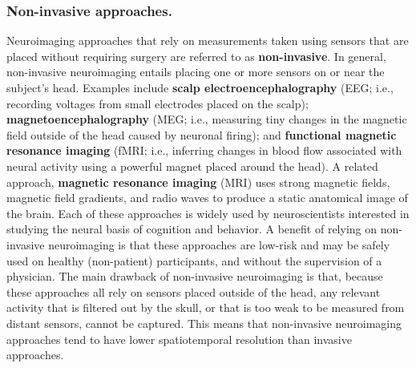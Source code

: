 \documentclass{llmxive}
\begin{document}
\subsubsection{Non-invasive approaches.}
Neuroimaging approaches that rely on measurements taken using sensors
that are placed without requiring surgery are referred to as
\textbf{non-invasive}.  In general, non-invasive neuroimaging entails
placing one or more sensors on or near the subject's head.  Examples
include \textbf{scalp electroencephalography} (EEG; i.e., recording
voltages from small electrodes placed on the scalp);
\textbf{magnetoencephalography} (MEG; i.e., measuring tiny changes in
the magnetic field outside of the head caused by neuronal firing); and
\textbf{functional magnetic resonance imaging} (fMRI; i.e., inferring
changes in blood flow associated with neural activity using a powerful
magnet placed around the head).  A related approach, \textbf{magnetic
  resonance imaging} (MRI) uses strong magnetic fields, magnetic field
gradients, and radio waves to produce a static anatomical image of the
brain.  Each of these approaches is widely used by neuroscientists
interested in studying the neural basis of cognition and behavior.  A
benefit of relying on non-invasive neuroimaging is that these
approaches are low-risk and may be safely used on healthy
(non-patient) participants, and without the supervision of a
physician.  The main drawback of non-invasive neuroimaging is that,
because these approaches all rely on sensors placed outside of the
head, any relevant activity that is filtered out by the skull, or that
is too weak to be measured from distant sensors, cannot be captured.
This means that non-invasive neuroimaging approaches tend to have
lower spatiotemporal resolution than invasive approaches.
\end{document}
